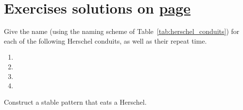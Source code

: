 \section*{Exercises \hfill \normalfont\textsf{\small solutions on \hyperlink{solutions_stable_circuitry}{page \pageref{solutions_stable_circuitry}}}}
\label{sec:stable_exercises}
\vspace*{-0.4cm}\hrulefill\vspace*{-0.3cm}\footnotesize\begin{multicols}{2}\vspace*{-0.4cm}\raggedcolumns{}
\setlength{\parskip}{0pt}

\begin{problem}\label{exer:name_conduit}
	Give the name (using the naming scheme of Table~\ref{tab:herschel_conduits}) for each of the following Herschel conduits, as well as their repeat time.\vspace*{-0.25cm}
		
	\begin{multicols}{2}
		\begin{enumerate}
			\item[\bf\color{ocre}(a)] 
				
			\item[\bf\color{ocre}(c)] 
				
			\item[\bf\color{ocre}(b)] 
				
			\item[\bf\color{ocre}(d)] 
		\end{enumerate}
	\end{multicols}
\end{problem}


\mfilbreak


\begin{problem}\label{exer:eat_herschel}
	Construct a stable pattern that eats a Herschel.
	
\end{problem}



\end{multicols}
